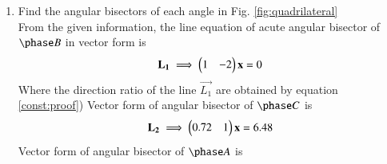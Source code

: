 \begin{enumerate}[label=\arabic*.,ref=\thesubsection.\theenumi]
%
\item Find the angular bisectors of each angle in Fig. \ref{fig:quadrilateral}
\label{const:quadrilateral}
\\
%
\solution 
From the given information, the line equation of acute angular bisector of $\phase B$ in vector form is 
\begin{align}
\label{eq:constr_a}
\mathbf{L_1} \implies \begin{pmatrix}1 & -2\end{pmatrix}\mathbf{x}=0
\end{align}
Where the direction ratio of the line $\vec{L_1}$ are obtained by equation \eqref{const:proof})
Vector form of angular bisector of $\phase C$ is
\begin{align}
\label{eq:constr_b}
\mathbf{L_2} \implies \begin{pmatrix}0.72 & 1\end{pmatrix}\mathbf{x} = 6.48
\end{align}
Vector form of angular bisector of $\phase A$ is

\end{enumerate}
